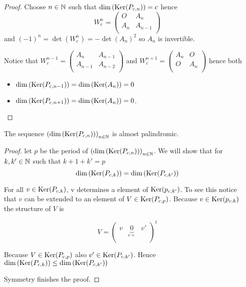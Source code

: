 \begin{proof}
  Choose $n\in\mathbb{N}$ such that $\dim\left(\operatorname{Ker}(P_{c,n})\right) = c$ hence
  \[
  W_{c}^{n}
  =
  \left(
  \begin{array}{cc}
    O & A_{n} \\
    A_{n} & A_{n-1} \\
  \end{array}
  \right)
  \]
  and $(-1)^{n} = \det(W_{c}^{n}) = -\det(A_{n})^{2}$ so $A_{n}$ is
  invertible.

  Notice that 
  $W_{c}^{n-1} = \left(\begin{smallmatrix} A_{n} & A_{n-1} \\A_{n-1} & A_{n-2} \\\end{smallmatrix}\right)$
  and
  $W_{c}^{n+1} = \left(\begin{smallmatrix} A_{n} & O \\ O & A_{n} \\\end{smallmatrix}\right)$
  hence both
  \begin{itemize}
    \item $\dim\left(\operatorname{Ker}(P_{c,n-1})\right) = \dim\left(\operatorname{Ker}(A_{n})\right) = 0$
    \item $\dim\left(\operatorname{Ker}(P_{c,n+1})\right) = \dim\left(\operatorname{Ker}(A_{n})\right) = 0$.
  \end{itemize}
\end{proof}

\begin{theorem}
  The sequence $\left(\dim\left(\operatorname{Ker}(P_{c,n})\right)\right)_{n\in\mathbb{N}}$
  is almost palindromic.
\end{theorem}

\begin{proof}
  let $p$ be the period of
  $\left(\dim\left(\operatorname{Ker}(P_{c,n})\right)\right)_{n\in\mathbb{N}}$. We will show
  that for $k,k'\in\mathbb{N}$ such that $k+1+k'=p$
  \[
  \dim\left(\operatorname{Ker}(P_{c,k})\right) = \dim\left(\operatorname{Ker}(P_{c,k'})\right)
  \]

  For all $v\in\operatorname{Ker}(P_{c,k})$, v determines a element of
  $\operatorname{Ker}(p_{c,k'})$. To see this notice that $v$ can be extended to an
  element of $V\in\operatorname{Ker}(P_{c,p})$. Because $v\in\operatorname{Ker}(p_{c,k})$ the
  structure of $V$ is
  
  \[
  V =
  \left(
  \begin{array}{ccc}
    v & \underbrace{0}_{c\times} & v' \\
  \end{array}
  \right)^{t}
  \]
  
  Because $V\in\operatorname{Ker}(P_{c,p})$ also
  $v'\in\operatorname{Ker}(P_{c,k'})$. Hence  $\dim\left(\operatorname{Ker}(P_{c,k})\right) \le
  \dim\left(\operatorname{Ker}(P_{c,k'})\right)$ 

  Symmetry finishes the proof.
\end{proof}
